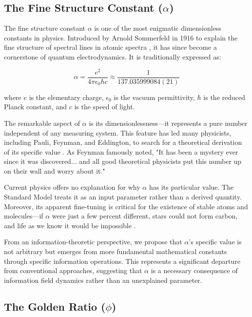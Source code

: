 \subsection{The Fine Structure Constant ($\alpha$)}

The fine structure constant $\alpha$ is one of the most enigmatic dimensionless constants in physics. Introduced by Arnold Sommerfeld in 1916 to explain the fine structure of spectral lines in atomic spectra \cite{sommerfeld1916quantentheorie}, it has since become a cornerstone of quantum electrodynamics. It is traditionally expressed as:

\begin{equation}
\alpha = \frac{e^2}{4\pi\epsilon_0\hbar c} \approx \frac{1}{137.035999084(21)}
\end{equation}

where $e$ is the elementary charge, $\epsilon_0$ is the vacuum permittivity, $\hbar$ is the reduced Planck constant, and $c$ is the speed of light.

The remarkable aspect of $\alpha$ is its dimensionlessness—it represents a pure number independent of any measuring system. This feature has led many physicists, including Pauli, Feynman, and Eddington, to search for a theoretical derivation of its specific value \cite{feynman1985qed, eddington1946fundamental}. As Feynman famously noted, "It has been a mystery ever since it was discovered... and all good theoretical physicists put this number up on their wall and worry about it."

Current physics offers no explanation for why $\alpha$ has its particular value. The Standard Model treats it as an input parameter rather than a derived quantity. Moreover, its apparent fine-tuning is critical for the existence of stable atoms and molecules—if $\alpha$ were just a few percent different, stars could not form carbon, and life as we know it would be impossible \cite{davies1982accidental}.

From an information-theoretic perspective, we propose that $\alpha$'s specific value is not arbitrary but emerges from more fundamental mathematical constants through specific information operations. This represents a significant departure from conventional approaches, suggesting that $\alpha$ is a necessary consequence of information field dynamics rather than an unexplained parameter.

\subsection{The Golden Ratio ($\phi$)}

